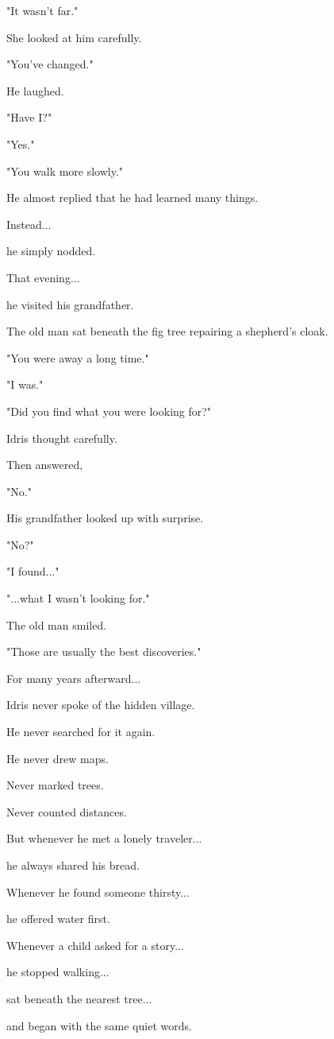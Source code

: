 \documentclass[12pt,openany]{book}
\begin{document}
"It wasn't far."

She looked at him carefully.

"You've changed."

He laughed.

"Have I?"

"Yes."

"You walk more slowly."

He almost replied that he had learned many things.

Instead...

he simply nodded.

That evening...

he visited his grandfather.

The old man sat beneath the fig tree repairing a shepherd's cloak.

"You were away a long time."

"I was."

"Did you find what you were looking for?"

Idris thought carefully.

Then answered,

"No."

His grandfather looked up with surprise.

"No?"

"I found..."

"...what I wasn't looking for."

The old man smiled.

"Those are usually the best discoveries."

For many years afterward...

Idris never spoke of the hidden village.

He never searched for it again.

He never drew maps.

Never marked trees.

Never counted distances.

But whenever he met a lonely traveler...

he always shared his bread.

Whenever he found someone thirsty...

he offered water first.

Whenever a child asked for a story...

he stopped walking...

sat beneath the nearest tree...

and began with the same quiet words.
\end{document}
